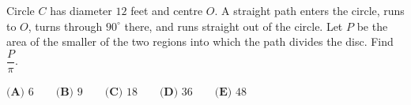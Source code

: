 Circle \(C\) has diameter \(12\) feet and centre \(O\). A straight path enters the circle, runs to \(O\), turns through \(90^\circ\) there, and runs straight out of the circle. Let \(P\) be the area of the smaller of the two regions into which the path divides the disc. Find \(\dfrac{P}{\pi}\).

\(\textbf{(A) } 6 \qquad\textbf{(B) } 9 \qquad\textbf{(C) } 18 \qquad\textbf{(D) } 36 \qquad\textbf{(E) } 48\)
